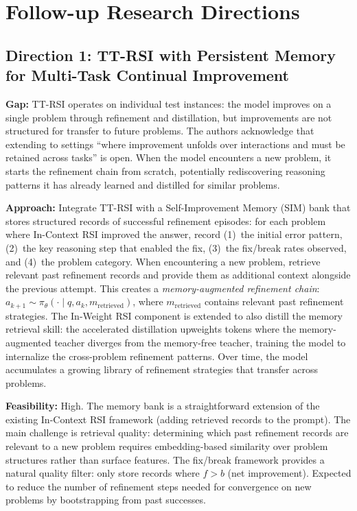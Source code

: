 \documentclass[11pt,a4paper]{article}
\begin{document}
\section{Follow-up Research Directions}

\subsection{Direction 1: TT-RSI with Persistent Memory for Multi-Task Continual Improvement}
\textbf{Gap:} TT-RSI operates on individual test instances: the model improves on a single problem through refinement and distillation, but improvements are not structured for transfer to future problems. The authors acknowledge that extending to settings ``where improvement unfolds over interactions and must be retained across tasks'' is open. When the model encounters a new problem, it starts the refinement chain from scratch, potentially rediscovering reasoning patterns it has already learned and distilled for similar problems.

\textbf{Approach:} Integrate TT-RSI with a Self-Improvement Memory (SIM) bank that stores structured records of successful refinement episodes: for each problem where In-Context RSI improved the answer, record (1)~the initial error pattern, (2)~the key reasoning step that enabled the fix, (3)~the fix/break rates observed, and (4)~the problem category. When encountering a new problem, retrieve relevant past refinement records and provide them as additional context alongside the previous attempt. This creates a \emph{memory-augmented refinement chain}: $a_{k+1} \sim \pi_\theta(\cdot \mid q, a_k, m_{\text{retrieved}})$, where $m_{\text{retrieved}}$ contains relevant past refinement strategies. The In-Weight RSI component is extended to also distill the memory retrieval skill: the accelerated distillation upweights tokens where the memory-augmented teacher diverges from the memory-free teacher, training the model to internalize the cross-problem refinement patterns. Over time, the model accumulates a growing library of refinement strategies that transfer across problems.

\textbf{Feasibility:} High. The memory bank is a straightforward extension of the existing In-Context RSI framework (adding retrieved records to the prompt). The main challenge is retrieval quality: determining which past refinement records are relevant to a new problem requires embedding-based similarity over problem structures rather than surface features. The fix/break framework provides a natural quality filter: only store records where $f > b$ (net improvement). Expected to reduce the number of refinement steps needed for convergence on new problems by bootstrapping from past successes.
\end{document}
